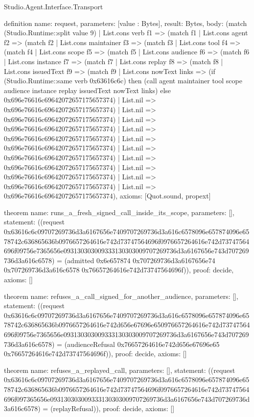 \begin{lexlean}{Studio.Agent.Interface.Transport}
\begin{semanticmodule}
definition{
  name: request,
  parameters: [value : Bytes],
  result: Bytes,
  body: (match (Studio.Runtime::split value 9)
    | List.cons verb f1 => (match f1
      | List.cons agent f2 => (match f2
        | List.cons maintainer f3 => (match f3
          | List.cons tool f4 => (match f4
            | List.cons scope f5 => (match f5
              | List.cons audience f6 => (match f6
                | List.cons instance f7 => (match f7
                  | List.cons replay f8 => (match f8
                    | List.cons issuedText f9 => (match f9
                      | List.cons nowText links => (if (Studio.Runtime::same verb 0x63616c6c) then (call agent maintainer tool scope audience instance replay issuedText nowText links) else 0x696e76616c69642072657175657374)
                      | List.nil => 0x696e76616c69642072657175657374)
                    | List.nil => 0x696e76616c69642072657175657374)
                  | List.nil => 0x696e76616c69642072657175657374)
                | List.nil => 0x696e76616c69642072657175657374)
              | List.nil => 0x696e76616c69642072657175657374)
            | List.nil => 0x696e76616c69642072657175657374)
          | List.nil => 0x696e76616c69642072657175657374)
        | List.nil => 0x696e76616c69642072657175657374)
      | List.nil => 0x696e76616c69642072657175657374)
    | List.nil => 0x696e76616c69642072657175657374),
  axioms: [Quot.sound, propext]
}

theorem{
  name: runs_a_fresh_signed_call_inside_its_scope,
  parameters: [],
  statement: ((request 0x63616c6c09707269736d3a6167656e7409707269736d3a616c6578096e657874096e6578742c636865636b0976657264616e742d73747564696f0976657264616e742d73747564696f09756e7365656e093130303009333130303009707269736d3a6167656e743d707269736d3a616c6578) = (admitted 0x6e657874 0x707269736d3a6167656e74 0x707269736d3a616c6578 0x76657264616e742d73747564696f)),
  proof: decide{},
  axioms: []
}

theorem{
  name: refuses_a_call_signed_for_another_audience,
  parameters: [],
  statement: ((request 0x63616c6c09707269736d3a6167656e7409707269736d3a616c6578096e657874096e6578742c636865636b0976657264616e742d656e67696e650976657264616e742d73747564696f09756e7365656e093130303009333130303009707269736d3a6167656e743d707269736d3a616c6578) = (audienceRefusal 0x76657264616e742d656e67696e65 0x76657264616e742d73747564696f)),
  proof: decide{},
  axioms: []
}

theorem{
  name: refuses_a_replayed_call,
  parameters: [],
  statement: ((request 0x63616c6c09707269736d3a6167656e7409707269736d3a616c6578096e657874096e6578742c636865636b0976657264616e742d73747564696f0976657264616e742d73747564696f097365656e093130303009333130303009707269736d3a6167656e743d707269736d3a616c6578) = (replayRefusal)),
  proof: decide{},
  axioms: []
}


\end{semanticmodule}
\end{lexlean}
